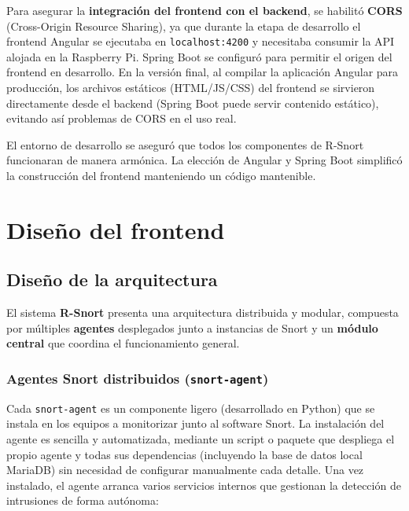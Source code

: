 \documentclass[11pt,a4paper,twoside]{report}
\begin{document}
Para asegurar la \textbf{integración del frontend con el backend}, se habilitó \textbf{CORS} (Cross-Origin Resource Sharing), ya que durante la etapa de desarrollo el frontend Angular se ejecutaba en \texttt{localhost:4200} y necesitaba consumir la API alojada en la Raspberry Pi. Spring Boot se configuró para permitir el origen del frontend en desarrollo. En la versión final, al compilar la aplicación Angular para producción, los archivos estáticos (HTML/JS/CSS) del frontend se sirvieron directamente desde el backend (Spring Boot puede servir contenido estático), evitando así problemas de CORS en el uso real.\newline

El entorno de desarrollo se aseguró que todos los componentes de R-Snort funcionaran de manera armónica. La elección de Angular y Spring Boot simplificó la construcción del frontend manteniendo un código mantenible.

\section{Diseño del frontend}

\subsection{Diseño de la arquitectura}

El sistema \textbf{R-Snort} presenta una arquitectura distribuida y modular, compuesta por múltiples \textbf{agentes} desplegados junto a instancias de Snort y un \textbf{módulo central} que coordina el funcionamiento general.

\subsubsection{Agentes Snort distribuidos (\texttt{snort-agent})}

Cada \texttt{snort-agent} es un componente ligero (desarrollado en Python) que se instala en los equipos a monitorizar junto al software Snort. La instalación del agente es sencilla y automatizada, mediante un script o paquete que despliega el propio agente y todas sus dependencias (incluyendo la base de datos local MariaDB) sin necesidad de configurar manualmente cada detalle. Una vez instalado, el agente arranca varios servicios internos que gestionan la detección de intrusiones de forma autónoma:
\end{document}
